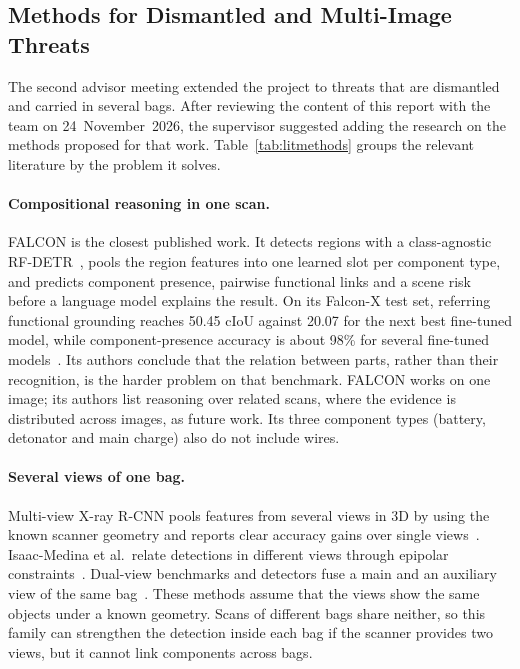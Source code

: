 \subsection{Methods for Dismantled and Multi-Image Threats}\label{sec:litdismantled}
The second advisor meeting extended the project to threats that are dismantled and
carried in several bags. After reviewing the content of this report with the team on
24~November~2026, the supervisor suggested adding the research on the methods proposed
for that work.
Table~\ref{tab:litmethods} groups the relevant literature by the problem it solves.

\paragraph{Compositional reasoning in one scan.}
FALCON is the closest published work. It detects regions with a class-agnostic
RF-DETR~\citep{robinson2026rfdetr}, pools the region features into one learned slot
per component type, and predicts component presence, pairwise functional links and
a scene risk before a language model explains the result. On its Falcon-X test set,
referring functional grounding reaches 50.45 cIoU against 20.07 for the next best
fine-tuned model, while component-presence accuracy is about 98\% for several
fine-tuned models~\citep{michael2026falcon}. Its authors conclude that the relation
between parts, rather than their recognition, is the harder problem on that
benchmark. FALCON works on one image; its authors list reasoning over related scans,
where the evidence is distributed across images, as future work. Its three component
types (battery, detonator and main charge) also do not include wires.

\paragraph{Several views of one bag.}
Multi-view X-ray R-CNN pools features from several views in 3D by using the known
scanner geometry and reports clear accuracy gains over single views~\citep{steitz2018multiview}.
Isaac-Medina et al.\ relate detections in different views through epipolar
constraints~\citep{isaacmedina2021epipolar}. Dual-view benchmarks and detectors fuse
a main and an auxiliary view of the same bag~\citep{ma2024dvxray,tao2025ldxray}.
These methods assume that the views show the same objects under a known geometry.
Scans of different bags share neither, so this family can strengthen the detection
inside each bag if the scanner provides two views, but it cannot link components
across bags.

